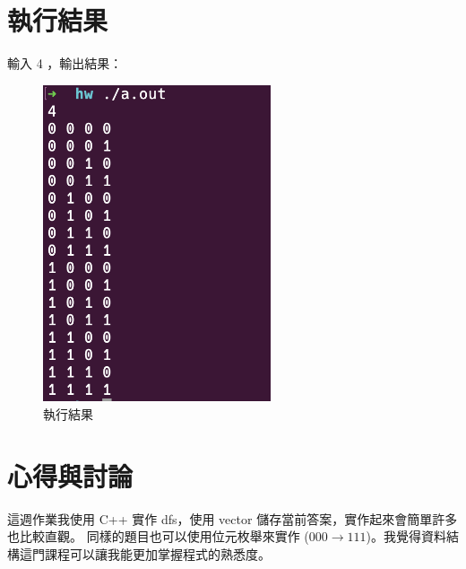 \documentclass[12pt, a4paper]{article}
\begin{document}
  \section{\fontsize{20pt}{22pt}\selectfont 執行結果}
    \begin{samepage}
      \fontsize{16pt}{18pt} \selectfont    
        輸入 4 ，輸出結果：
        \begin{figure}[ht]
          \centering
          \includegraphics[width=0.6\textwidth]{../image/result.png}
          \caption{執行結果}
        \end{figure}  
      \normalsize
    \end{samepage}

  \section{\fontsize{20pt}{22pt}\selectfont 心得與討論}
  \begin{samepage}
    \fontsize{16pt}{18pt} \selectfont
      這週作業我使用 C++ 實作 dfs，使用 vector 儲存當前答案，實作起來會簡單許多也比較直觀。
      同樣的題目也可以使用位元枚舉來實作 ($000 \to 111$)。我覺得資料結構這門課程可以讓我能更加掌握程式的熟悉度。
    \normalfont
  \end{samepage}
\end{document}
